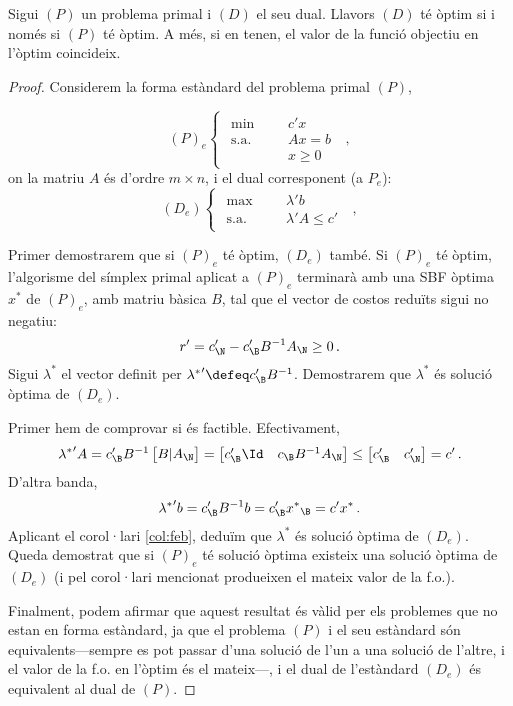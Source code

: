 \begin{teo}\label{teo:dualitat-fort}
    Sigui $\left(P\right)$ un problema primal i $\left(D\right)$ el seu dual. Llavors $(D)$ té òptim si i només si $(P)$ té òptim. A més, si en tenen, el valor de la funció objectiu en l'òptim coincideix.
    \begin{proof}
    	Considerem la forma estàndard del problema primal $(P)$,
    	
    	\[
    		(P)_e
    		\begin{cases}
    		\begin{aligned}
			   	\min 			&&& c'x\\
	    		\text{s.a.}		&&& Ax = b\\
	    						&&& x\ge0
    		\end{aligned}
    		\end{cases}\ ,
    	\]
    	on la matriu $A$ és d'ordre $m\times n$, i el dual corresponent (a $P_e$):
    	\[
	    	(D_e)
	    	\begin{cases}
	    	\begin{aligned}
	    	\max 			&&& \lambda'b\\
	    	\text{s.a.}		&&& \lambda'A \le c'
	    	\end{aligned}
	    	\end{cases}\ ,
    	\]
    	
    	Primer demostrarem que si $(P)_e$ té òptim, $(D_e)$ també. Si $(P)_e$ té òptim, l'algorisme del símplex primal aplicat a $(P)_e$ terminarà amb una SBF òptima $x^\ast$ de $(P)_e$, amb matriu bàsica $B$, tal que el vector de costos reduïts sigui no negatiu: \[r' = c_\N '- c_\B' B^{-1} A_\N \ge 0\,.\] Sigui $\lambda^\ast$ el vector definit per ${\lambda^\ast}'\defeq c_\B'B^{-1}$. Demostrarem que $\lambda^\ast$ és solució òptima de $(D_e)$.
    	
    	Primer hem de comprovar si és factible. Efectivament, 
    	\[
    		{\lambda^\ast}'A = 
    		c_\B' B^{-1}
    		\begin{bmatrix}
		   		B 	\vert 	A_\N
    		\end{bmatrix} =
    		\begin{bmatrix}
    			c_\B' \Id & c_\B B^{-1} A_\N    			
    		\end{bmatrix}
    		\le
    		\begin{bmatrix}
	    		c_\B' 	&c_\N'
    		\end{bmatrix}
    		= c'\,.
    	\]
    	D'altra banda, \[{\lambda^\ast}'b = c_\B' B^{-1} b = c_\B' {x^\ast}_\B = c'{x^\ast}\,. \] Aplicant el corol·lari \ref{col:feb}, deduïm que $\lambda^\ast$ és solució òptima de $(D_e)$. Queda demostrat que si $(P)_e$ té solució òptima existeix una solució òptima de $(D_e)$ (i pel corol·lari mencionat produeixen el mateix valor de la f.o.).
    	
    	Finalment, podem afirmar que aquest resultat és vàlid per els problemes que no estan en forma estàndard, ja que el problema $(P)$ i el seu estàndard són equivalents---sempre es pot passar d'una solució de l'un a una solució de l'altre, i el valor de la f.o. en l'òptim és el mateix---, i el dual de l'estàndard $(D_e)$ és equivalent al dual de $(P)$.
    \end{proof}
\end{teo}

